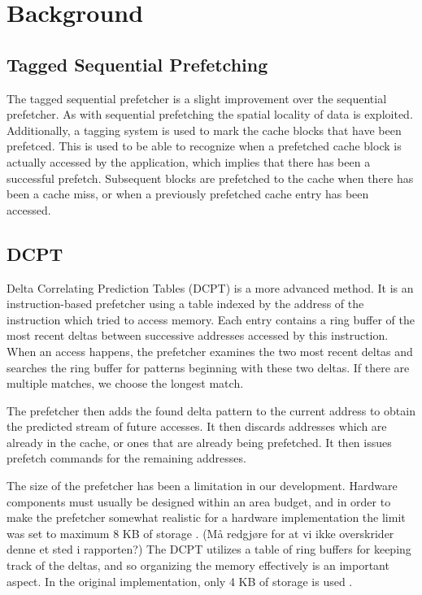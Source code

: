 \section{Background}

\subsection*{Tagged Sequential Prefetching}

The tagged sequential prefetcher is a slight improvement over the sequential
prefetcher. As with sequential prefetching the spatial locality 
of data is exploited. Additionally, a tagging system is used to mark the cache 
blocks that have been prefetced. This is used to be able to recognize when a 
prefetched cache block is actually accessed by the application, which implies 
that there has been a successful prefetch. Subsequent blocks are prefetched 
to the cache when there has been a cache miss, or when a previously prefetched 
cache entry has been accessed.\cite{grannaes}

\subsection*{DCPT}

Delta Correlating Prediction Tables (DCPT) is a more advanced method. It is an
instruction-based prefetcher using a table indexed by the address of the
instruction which tried to access memory. Each entry contains a ring buffer of
the most recent deltas between successive addresses accessed by this instruction.
When an access happens, the prefetcher examines the two most recent deltas and
searches the ring buffer for patterns beginning with these two deltas. If there
are multiple matches, we choose the longest match.

The prefetcher then adds the found delta pattern to the current address to obtain
the predicted stream of future accesses. It then discards addresses which are
already in the cache, or ones that are already being prefetched. It then issues
prefetch commands for the remaining addresses.



The size of the prefetcher has been a limitation in our development. Hardware
components must usually be designed within an area budget, and in order to make
the prefetcher somewhat realistic for a hardware implementation the limit was
set to maximum 8 KB of storage \cite{guidelines}. (Må redgjøre for at vi ikke overskrider denne et
sted i rapporten?) The DCPT utilizes a table of ring buffers for keeping track
of the deltas, and so organizing the memory effectively is an important aspect.
In the original implementation, only 4 KB of storage is used \cite{dcpt}.



